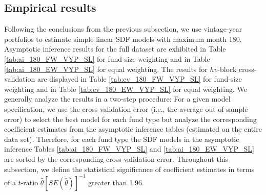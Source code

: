 \documentclass[12pt]{article}
\begin{document}
\subsection{Empirical results}

Following the conclusions from the previous subsection, we use vintage-year portfolios to estimate simple linear SDF models with maximum month 180.
Asymptotic inference results for the full dataset are exhibited in Table \ref{tab:ai_180_FW_VYP_SL} for fund-size weighting and in Table \ref{tab:ai_180_EW_VYP_SL} for equal weighting.
The results for $hv$-block cross-validation are displayed in Table \ref{tab:cv_180_FW_VYP_SL} for fund-size weighting and in Table \ref{tab:cv_180_EW_VYP_SL} for equal weighting.
We generally analyze the results in a two-step procedure: For a given model specification, we use the cross-validation error (i.e., the average out-of-sample error) to select the best model for each fund type but analyze the corresponding coefficient estimates from the asymptotic inference tables (estimated on the entire data set).
Therefore, for each fund type the SDF models in the asymptotic inference Tables \ref{tab:ai_180_FW_VYP_SL} and \ref{tab:ai_180_EW_VYP_SL} are sorted by the corresponding cross-validation error.
Throughout this subsection, we define the statistical significance of coefficient estimates in terms of a $t$-ratio $\hat{\theta}[SE(\hat{\theta})]^{-1}$ greater than 1.96.

\begin{table}[ht]
	\centering
	\caption{
		Top-level overview over Table \ref{tab:ai_180_FW_VYP_SL} to \ref{tab:cv_180_EW_VYP_SL}: 
		Averages of absolute values of coefficient estimates and standard errors (SEs).
		We see that asymptotic SEs are much higher than the SEs obtained by cross-validation.
	} 
	\label{tab:ai_sum_abs}
\end{table}
\end{document}
